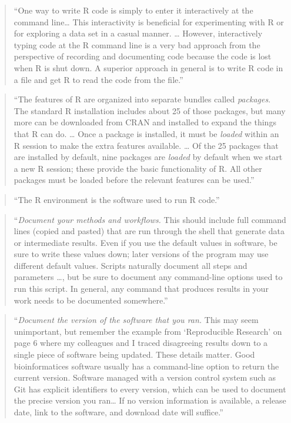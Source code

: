 \documentclass[]{tufte-book}
\begin{document}
\begin{quote}
``One way to write R code is simply to enter it interactively at the command line\ldots{} This
interactivity is beneficial for experimenting with R or for exploring a data set in a casual
manner. \ldots{} However, interactively typing code at the R command line is a very bad approach from
the perspective of recording and documenting code because the code is lost when R is shut down.
A superior approach in general is to write R code in a file and get R to read the code from the file.'' \citep{murrell2009introduction}
\end{quote}

\begin{quote}
``The features of R are organized into separate bundles called \emph{packages}. The standard R
installation includes about 25 of those packages, but many more can be downloaded from CRAN and
installed to expand the things that R can do. \ldots{} Once a package is installed, it must be
\emph{loaded} within an R session to make the extra features available. \ldots{} Of the 25 packages
that are installed by default, nine packages are \emph{loaded} by default when we start a new
R session; these provide the basic functionality of R. All other packages must be loaded
before the relevant features can be used.'' \citep{murrell2009introduction}
\end{quote}

\begin{quote}
``The R environment is the software used to run R code.'' \citep{murrell2009introduction}
\end{quote}

\begin{quote}
``\emph{Document your methods and workflows.} This should include full command lines (copied
and pasted) that are run through the shell that generate data or intermediate results.
Even if you use the default values in software, be sure to write these values down;
later versions of the program may use different default values. Scripts naturally
document all steps and parameters \ldots, but be sure to document any command-line options
used to run this script. In general, any command that produces results in your work needs
to be documented somewhere.'' \citep{buffalo2015bioinformatics}
\end{quote}

\begin{quote}
``\emph{Document the version of the software that you ran.} This may seem unimportant, but
remember the example from `Reproducible Research' on page 6 where my colleagues and I
traced disagreeing results down to a single piece of software being updated. These
details matter. Good bioinformatices software usually has a command-line option to
return the current version. Software managed with a version control system such as
Git has explicit identifiers to every version, which can be used to document the
precise version you ran\ldots{} If no version information is available, a release date,
link to the software, and download date will suffice.'' \citep{buffalo2015bioinformatics}
\end{quote}
\end{document}
